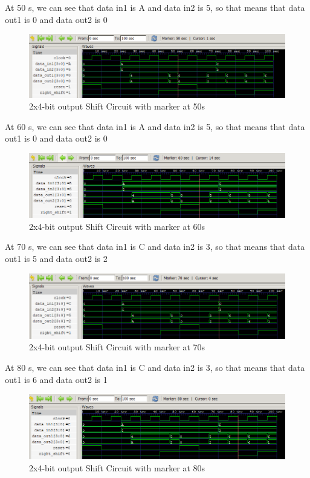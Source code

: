 \documentclass[12pt]{article}
\begin{document}
\newpage

At 50 s, we can see that data in1 is A and data in2 is 5, so that means that data out1 is 0 and data out2 is 0
\begin{figure}[h]
    \centering
    \includegraphics[width = 1.0\textwidth]{figs/Shift50.png}
    \caption{2x4-bit output Shift Circuit with marker at 50s}
    \label{fig:enter-label}
\end{figure}


At 60 s, we can see that data in1 is A and data in2 is 5, so that means that data out1 is 0 and data out2 is 0
\begin{figure}[h]
    \centering
    \includegraphics[width = 1.0\textwidth]{figs/Shift60.png}
    \caption{2x4-bit output Shift Circuit with marker at 60s}
    \label{fig:enter-label}
\end{figure}

At 70 s, we can see that data in1 is C and data in2 is 3, so that means that data out1 is 5 and data out2 is 2
\begin{figure}[h]
    \centering
    \includegraphics[width = 1.0\textwidth]{figs/Shift70.png}
    \caption{2x4-bit output Shift Circuit with marker at 70s}
    \label{fig:enter-label}
\end{figure}

\newpage

At 80 s, we can see that data in1 is C and data in2 is 3, so that means that data out1 is 6 and data out2 is 1
\begin{figure}[h]
    \centering
    \includegraphics[width = 1.0\textwidth]{figs/Shift80.png}
    \caption{2x4-bit output Shift Circuit with marker at 80s}
    \label{fig:enter-label}
\end{figure}
\end{document}
